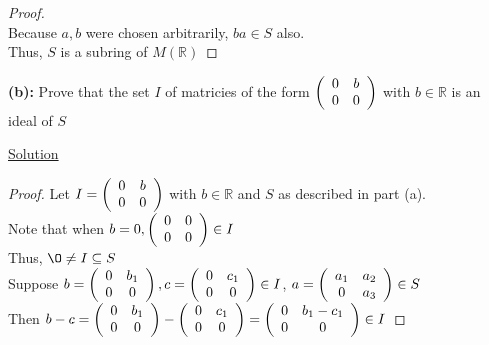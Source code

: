 \documentclass{article} %
\begin{document}
\begin{addmargin}[1em]{0em}
\begin{addmargin}[1em]{0em}
\begin{proof}
\\Because $a,b$ were chosen arbitrarily, $ba \in S$ also.
\\Thus, $S$ is a subring of $M(\mathbb{R})$
\end{proof}
\end{addmargin}
\end{addmargin}

\textbf{(b): }Prove that the set $I$ of matricies of the form $\left( \begin{array}{c c} 0 & b \\ 0 & 0 \end{array} \right)$ with $b \in \mathbb{R}$ is an ideal of $S$
\\
\begin{addmargin}[1em]{0em}
\underline{Solution}
\begin{addmargin}[1em]{0em}
\begin{proof}
Let $I = \left( \begin{array}{c c} 0 & b \\ 0 & 0 \end{array} \right)$ with $b \in \mathbb{R}$ and $S$ as described in part (a).
\\Note that when $b = 0, \left( \begin{array}{c c} 0 & 0 \\ 0 & 0 \end{array} \right) \in I$
\\Thus, $\O \neq I \subseteq S$
\\Suppose $b = \left( \begin{array}{c c} 0 & b_1 \\ 0 & 0 \end{array} \right), c = \left( \begin{array}{c c} 0& c_1 \\ 0 & 0 \end{array} \right) \in I$, $a = \left( \begin{array}{c c} a_1 & a_2 \\ 0 & a_3 \end{array} \right) \in S$
\\Then $b - c = \left( \begin{array}{c c} 0 & b_1 \\ 0 & 0 \end{array} \right) - \left( \begin{array}{c c} 0& c_1 \\ 0 & 0 \end{array} \right) = \left( \begin{array}{c c} 0& b_1 - c_1 \\ 0 & 0 \end{array} \right) \in I$

\end{proof}
\end{addmargin}
\end{addmargin}
\end{document}
